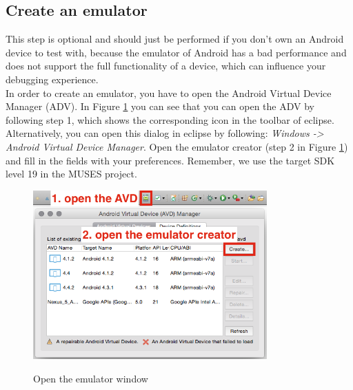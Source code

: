 \subsection{Create an emulator}
\label{sec:createanemulator}
This step is optional and should just be performed if you don't own an Android device to test with, because the emulator of Android has a bad performance and does not support the full functionality of a device, which can influence your debugging experience.
\\
\linebreak
In order to create an emulator, you have to open the Android Virtual Device Manager (ADV). In Figure \ref{fig:emu_part_1} you can see that you can open the ADV by following step 1, which shows the corresponding icon in the toolbar of eclipse. Alternatively, you can open this dialog in eclipse by following: \textit{Windows -> Android Virtual Device Manager}. Open the emulator creator (step 2 in Figure \ref{fig:emu_part_1}) and fill in the fields with your preferences. Remember, we use the target SDK level 19 in the MUSES project.

\begin{figure}
  \begin{center}
    \includegraphics[width=0.8\textwidth]{./Figures/emulator_part_1}
    \label{fig:emu_part_1}
    \caption{Open the emulator window}
  \end{center}
\end{figure}



